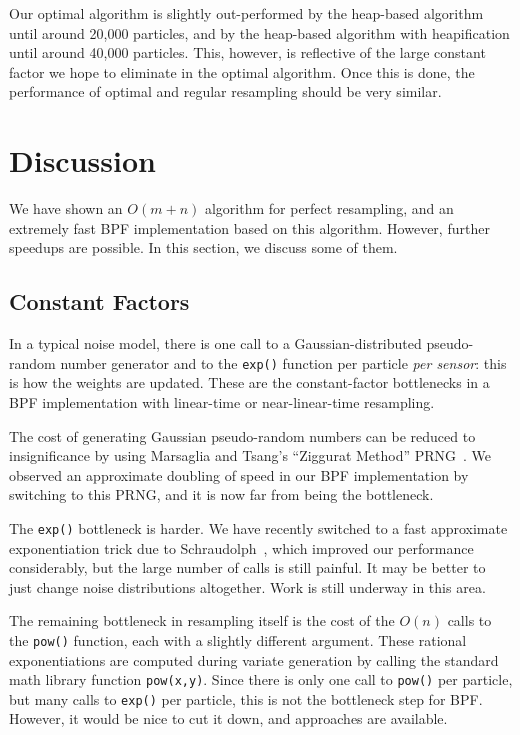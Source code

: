 \documentclass[12pt]{article}
\begin{document}
  Our optimal algorithm is slightly out-performed by the
  heap-based algorithm until around 20,000 particles, and by
  the heap-based algorithm with heapification until around
  40,000 particles.  This, however, is reflective of the
  large constant factor we hope to eliminate in the optimal
  algorithm.  Once this is done, the performance of optimal
  and regular resampling should be very similar.

\section{Discussion}

  We have shown an $O(m + n)$ algorithm for perfect
  resampling, and an extremely fast BPF implementation based
  on this algorithm.  However, further speedups are
  possible.  In this section, we discuss some of them.

\subsection{Constant Factors}

  In a typical noise model, there is one call
  to a Gaussian-distributed pseudo-random number generator
  and to the {\tt exp()} function per particle {\em per
  sensor}: this is how the weights are updated.  These are the
  constant-factor bottlenecks in a BPF implementation with
  linear-time or near-linear-time resampling.

  The cost of generating Gaussian pseudo-random numbers can
  be reduced to insignificance by using Marsaglia and
  Tsang's ``Ziggurat Method'' PRNG~\cite{ziggurat}.  We
  observed an approximate doubling of speed in our BPF
  implementation by switching to this PRNG, and it is now
  far from being the bottleneck.

  The {\tt exp()} bottleneck is harder.  We have recently
  switched to a fast approximate exponentiation trick due to
  Schraudolph~\cite{exp}, which improved our performance
  considerably, but the large number of calls is still
  painful.  It may be better to just change noise
  distributions altogether.  Work is still underway in this
  area.


  The remaining bottleneck in resampling itself is the cost
  of the $O(n)$ calls to the {\tt pow()} function, each with
  a slightly different argument.  These rational
  exponentiations are computed during variate generation by
  calling the standard math library function {\tt pow(x,y)}.
  Since there is only one call to {\tt pow()} per particle,
  but many calls to {\tt exp()} per particle, this is not
  the bottleneck step for BPF.  However, it would be nice to
  cut it down, and approaches are available.
\end{document}
